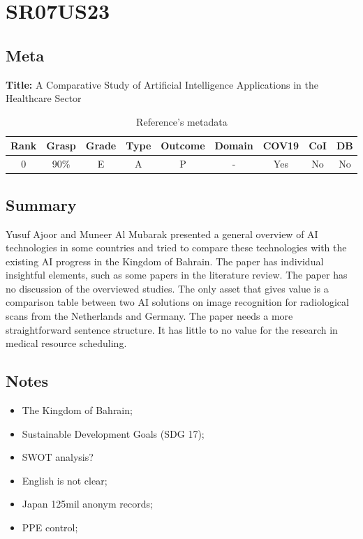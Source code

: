 \section{ SR07US23 }


\subsection{Meta}

    \textbf{Title:}
    A Comparative Study of Artificial Intelligence Applications in the Healthcare Sector

    \begin{table}[H]
        \centering
        \begin{tabular}{|c|c|c|c|c|c|c|c|c|}
            \hline
                \textbf{Rank} & \textbf{Grasp} & \textbf{Grade} & \textbf{Type} & \textbf{Outcome} & \textbf{Domain} & \textbf{COV19} & \textbf{CoI} & \textbf{DB} \\
            \hline
                0 & 90\% & E & A & P & - & Yes & No & No \\
            \hline
        \end{tabular}
        \caption{Reference's metadata}
        \label{tab:SR07US23}
    \end{table}

\subsection{Summary}
    Yusuf Ajoor and Muneer Al Mubarak \cite{x101} presented a general overview of AI technologies in some countries and tried to compare these technologies with the existing AI progress in the Kingdom of Bahrain. The paper has individual insightful elements, such as some papers in the literature review. The paper has no discussion of the overviewed studies. The only asset that gives value is a comparison table between two AI solutions on image recognition for radiological scans from the Netherlands and Germany. The paper needs a more straightforward sentence structure. It has little to no value for the research in medical resource scheduling.

\subsection{Notes}
    \begin{itemize}
        \item The Kingdom of Bahrain;
        \item Sustainable Development Goals (SDG 17);
        \item SWOT analysis?
        \item English is not clear;
        \item Japan 125mil anonym records;
        \item PPE control;
    \end{itemize}


